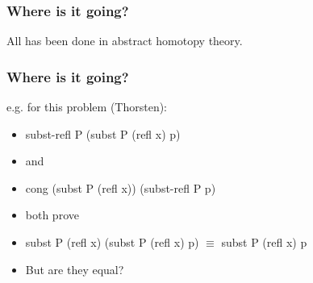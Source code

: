 \documentclass[12pt,pdflatex,hyperref={pdfstartview=Fit,bookmarks=true,bookmarksopen=true,pdfpagemode=None,colorlinks=true,linkcolor=unserblau,urlcolor=unserblau},notes=hide,t,handout]{beamer}
\begin{document}
\begin{frame}
\frametitle{Where is it going?}

\begin{center} All has been done in abstract homotopy theory. \end{center}

\vspace{1pt}

\end{frame}


\begin{frame}
\frametitle{Where is it going?}
\vspace{1pt}

e.g. for this problem (Thorsten): 
\vspace{1pt}

\begin{itemize}
\item subst-refl P (subst P (refl x) p)
\item[] and
\item cong (subst P (refl x)) (subst-refl P p)

\item[] both prove
\item subst P (refl x) (subst P (refl x) p) $\equiv$ subst P (refl x) p
\item[] But are they equal?
\end{itemize}
\end{frame}


%
%
\end{document}
